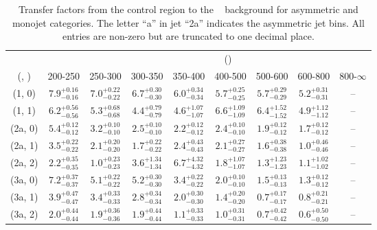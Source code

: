 \begin{table}[h!]
\tiny
\centering
\caption{Transfer factors from the \mmj control region to the \zInv~ background for asymmetric and monojet categories. The letter ``a'' in jet \eg ``2a''  indicates the asymmetric jet bins. All entries are non-zero but are truncated to one decimal place.\label{tab:tf_zinv_mumu_asym}}
\begin{tabular}
{ccccccccc}
	\hline\hline
&	& \multicolumn{8}{c}{\scalht (\gev)} \\ 
	 (\njet,  \nb) & 200-250 & 250-300 & 300-350 & 350-400 & 400-500 & 500-600 & 600-800 & 800-$\infty$ \\ [0.8ex] 
\hline
	(1, 0) & $7.9^{+ 0.16 }_{- 0.16 }$ & $7.0^{+ 0.22 }_{- 0.22 }$ & $6.7^{+ 0.30 }_{- 0.30 }$ & $6.0^{+ 0.34 }_{- 0.34 }$ & $5.7^{+ 0.25 }_{- 0.25 }$ & $5.7^{+ 0.29 }_{- 0.29 }$ & $5.2^{+ 0.31 }_{- 0.31 }$ & -- \\[0.5ex] 
	(1, 1) & $6.2^{+ 0.56 }_{- 0.56 }$ & $5.3^{+ 0.68 }_{- 0.68 }$ & $4.4^{+ 0.79 }_{- 0.79 }$ & $4.6^{+ 1.07 }_{- 1.07 }$ & $6.6^{+ 1.09 }_{- 1.09 }$ & $6.4^{+ 1.52 }_{- 1.52 }$ & $4.9^{+ 1.12 }_{- 1.12 }$ & -- \\[0.5ex] 
	(2a, 0) & $5.4^{+ 0.12 }_{- 0.12 }$ & $3.2^{+ 0.10 }_{- 0.10 }$ & $2.5^{+ 0.10 }_{- 0.10 }$ & $2.2^{+ 0.12 }_{- 0.12 }$ & $2.4^{+ 0.10 }_{- 0.10 }$ & $1.9^{+ 0.12 }_{- 0.12 }$ & $1.7^{+ 0.12 }_{- 0.12 }$ & -- \\[0.5ex] 
	(2a, 1) & $3.5^{+ 0.22 }_{- 0.22 }$ & $2.1^{+ 0.20 }_{- 0.20 }$ & $1.7^{+ 0.22 }_{- 0.22 }$ & $2.4^{+ 0.43 }_{- 0.43 }$ & $2.1^{+ 0.27 }_{- 0.27 }$ & $1.6^{+ 0.38 }_{- 0.38 }$ & $1.0^{+ 0.46 }_{- 0.46 }$ & -- \\[0.5ex] 
	(2a, 2) & $2.2^{+ 0.35 }_{- 0.35 }$ & $1.0^{+ 0.23 }_{- 0.23 }$ & $3.6^{+ 1.34 }_{- 1.34 }$ & $6.7^{+ 4.32 }_{- 4.32 }$ & $1.8^{+ 1.07 }_{- 1.07 }$ & $1.3^{+ 1.23 }_{- 1.23 }$ & $1.1^{+ 1.02 }_{- 1.02 }$ & -- \\[0.5ex] 
	(3a, 0) & $7.2^{+ 0.37 }_{- 0.37 }$ & $5.1^{+ 0.22 }_{- 0.22 }$ & $5.2^{+ 0.30 }_{- 0.30 }$ & $3.4^{+ 0.22 }_{- 0.22 }$ & $2.0^{+ 0.10 }_{- 0.10 }$ & $1.5^{+ 0.13 }_{- 0.13 }$ & $1.3^{+ 0.12 }_{- 0.12 }$ & -- \\[0.5ex] 
	(3a, 1) & $3.9^{+ 0.47 }_{- 0.47 }$ & $3.4^{+ 0.33 }_{- 0.33 }$ & $2.8^{+ 0.34 }_{- 0.34 }$ & $2.0^{+ 0.30 }_{- 0.30 }$ & $1.4^{+ 0.20 }_{- 0.20 }$ & $0.7^{+ 0.17 }_{- 0.17 }$ & $0.8^{+ 0.21 }_{- 0.21 }$ & -- \\[0.5ex] 
	(3a, 2) & $2.0^{+ 0.44 }_{- 0.44 }$ & $1.9^{+ 0.36 }_{- 0.36 }$ & $1.9^{+ 0.44 }_{- 0.44 }$ & $1.1^{+ 0.33 }_{- 0.33 }$ & $1.0^{+ 0.31 }_{- 0.31 }$ & $0.7^{+ 0.42 }_{- 0.42 }$ & $0.6^{+ 0.50 }_{- 0.50 }$ & -- \\[0.5ex] 

\end{tabular}
\end{table}
